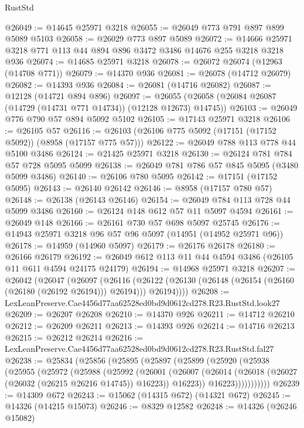 \begin{lexlean}{RustStd}
\begin{coremodule}
@26049 := @14645 @25971 @3218
@26055 := @26049 @773 @791 @897 @899 @5089 @5103
@26058 := @26029 @773 @897 @5089
@26072 := @14666 @25971 @3218 @771 @113 @44 @894 @896 @3472 @3486 @14676 @255 @3218 @3218 @936
@26074 := @14685 @25971 @3218
@26078 := @26072 @26074 (@12963 (@14708 @771))
@26079 := @14370 @936
@26081 := @26078 (@14712 @26079)
@26082 := @14393 @936
@26084 := @26081 (@14716 @26082)
@26087 := @12128 (@14721 @894 @896)
@26097 := @26055 (@26058 (@26084 @26087 (@14729 (@14731 @771 @14734)) (@12128 @12673) @14745))
@26103 := @26049 @776 @790 @57 @894 @5092 @5102
@26105 := @17143 @25971 @3218
@26106 := @26105 @57
@26116 := @26103 (@26106 @775 @5092 (@17151 (@17152 @5092)) (@8958 (@17157 @775 @57)))
@26122 := @26049 @788 @113 @778 @44 @5100 @3486
@26124 := @21425 @25971 @3218
@26130 := @26124 @781 @784 @57 @728 @5095 @5099
@26138 := @26049 @781 @786 @57 @845 @5095 (@3480 @5099 @3486)
@26140 := @26106 @780 @5095
@26142 := @17151 (@17152 @5095)
@26143 := @26140 @26142
@26146 := @8958 (@17157 @780 @57)
@26148 := @26138 (@26143 @26146)
@26154 := @26049 @784 @113 @728 @44 @5099 @3486
@26160 := @26124 @148 @612 @57 @11 @5097 @4594
@26161 := @26049 @148
@26166 := @26161 @730 @57 @698 @5097 @25745
@26176 := @14943 @25971 @3218 @96 @57 @96 @5097 (@14951 (@14952 @25971 @96))
@26178 := @14959 (@14960 @5097)
@26179 := @26176 @26178
@26180 := @26166 @26179
@26192 := @26049 @612 @113 @11 @44 @4594 @3486 (@26105 @11 @611 @4594 @24175 @24179)
@26194 := @14968 @25971 @3218
@26207 := @26042
    (@26047
      (@26097
        (@26116
          (@26122 (@26130 (@26148 (@26154 (@26160 (@26180 (@26192 @26194))) @26194))) @26194))))
@26208 := LexLeanPreserve.Cae4456d77aa62528ed0bd9d0612cd278.R23.RustStd.look27
@26209 := @26207 @26208
@26210 := @14370 @926
@26211 := @14712 @26210
@26212 := @26209 @26211
@26213 := @14393 @926
@26214 := @14716 @26213
@26215 := @26212 @26214
@26216 := LexLeanPreserve.Cae4456d77aa62528ed0bd9d0612cd278.R23.RustStd.fal27
@26238 := @25834
    (@25856
      (@25895
        (@25897
          (@25899
            (@25920
              (@25938
                (@25955
                  (@25972
                    (@25988
                      (@25992
                        (@26001
                          (@26007
                            (@26014
                              (@26018 (@26027 (@26032 (@26215 @26216 @14745)) @16223))
                              @16223))
                          @16223)))))))))))
@26239 := @14309 @672
@26243 := @15062 (@14315 @672) (@14321 @672)
@26245 := @14326 (@14215 @15073)
@26246 := @8329 @12582
@26248 := @14326 (@26246 @15082)

\end{coremodule}
\end{lexlean}
